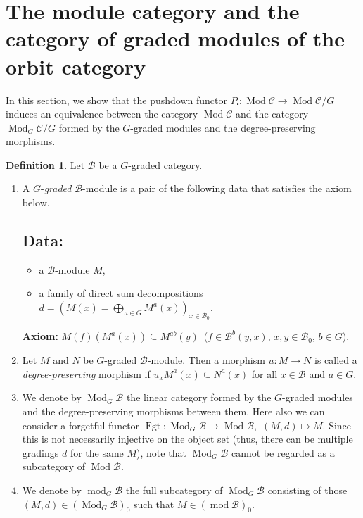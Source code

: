 \documentclass{surv-l}
\numberwithin{equation}{chapter}
\numberwithin{figure}{chapter}
\theoremstyle{plain}
\theoremstyle{definition}
\newtheorem{dfn}[thm]{Definition}
\theoremstyle{remark}
\DeclareMathOperator{\Mod}{Mod}
\DeclareMathOperator{\Fgt}{Fgt}
\begin{document}
\section[The category of graded modules of the orbit category]{The module category and the category of graded modules of the orbit category}

In this section, we show that the pushdown functor
$P_{\centerdot}\colon \Mod{\mathcal{C}} \to \Mod{\mathcal{C}}/G$
induces an equivalence between the category $\Mod {\mathcal{C}}$
and the category $\Mod_{G} {\mathcal{C}}/G$ formed by
the $G$-graded modules and the degree-preserving morphisms. \pagebreak 

\begin{dfn}
\label{graded-mod-hmg}
Let $\mathcal{B}$ be a $G$-graded category.
\begin{enumerate}
\item
A $G$-\emph{graded} $\mathcal{B}$-module is a pair of the following data that satisfies the  axiom below.

\subsection*{Data:}
\begin{itemize}
\item
a $\mathcal{B}$-module $M$,
\item
a family of direct sum decompositions
{\small$d \!=\!
(M(x) \!=\! \bigoplus_{a \in G} M^{a}(x))_{x \in \mathcal{B}_0}$}.
\end{itemize}
{\bf Axiom:}
$M(f)(M^{a}(x)) \subseteq M^{ab}(y)$\ ($f\in \mathcal{B}^{b}(y,x)$, $x,y\in \mathcal{B}_0$, $b \in G$).

\item
Let $M$ and $N$ be $G$-graded $\mathcal{B}$-module.
Then a morphism $u\colon M \to N$ is called a \emph{degree-preserving} morphism
if
$u_{x}M^{a}(x) \subseteq N^{a}(x)$ for all $x\in \mathcal{B}$ and $a\in G$.

\item
We denote by $\Mod_{G}\mathcal{B}$ the linear category formed by the $G$-graded modules
and the degree-preserving morphisms between them.
Here also we can consider a forgetful functor
$\Fgt\colon \Mod_{G}\mathcal{B} \to \Mod\mathcal{B}$,\ $(M,d) \mapsto M$.
Since this is not necessarily injective on the object set
(thus, there can be multiple gradings $d$ for the same $M$),
note that $\Mod_{G}\mathcal{B}$ cannot be regarded as a subcategory of $\Mod\mathcal{B}$.

\item
We denote by $\operatorname{mod}_G\mathcal{B}$ the full subcategory of $\Mod_G\mathcal{B}$
consisting of those $(M, d) \in (\Mod_G\mathcal{B})_0$ such that
$M \in (\operatorname{mod} \mathcal{B})_0$.
\end{enumerate}
\end{dfn}
\end{document}
